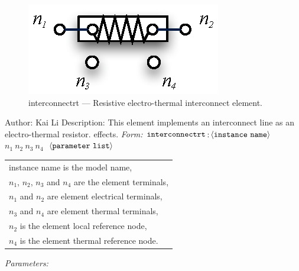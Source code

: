 \documentclass{article}
\begin{document}
\myThickLine
\normalsize
\newline
\begin{figure}[h]
\centerline{\includegraphics[scale=1.5]{interconnectrt.eps}} \caption{interconnectrt --- Resistive
electro-thermal interconnect element.}
\end{figure}
\newline
Author: Kai Li
\newline
\myThickLine
\newline
Description:\newline
This element implements an interconnect line as an electro-thermal resistor. effects.
\newline
\myThickLine
\newline
\textit{Form:}
$\tt interconnectrt$:$\langle \tt{instance\ name}\rangle$ $n_1\ n_2\ n_3\
n_4\ $ $\langle \tt{parameter\ list}\rangle$
\newline
\bigskip
\begin{tabular}{l}
instance name is the model name,\\
$n_1$, $n_2$, $n_3$ and $n_4$ are the element terminals, \\
$n_1$ and $n_2$ are element electrical terminals, \\
$n_3$ and $n_4$ are element thermal terminals, \\
$n_2$ is the element local reference node,\\
$n_4$ is the element thermal reference node. \\
\end{tabular}
\newline
\myThickLine
\textit{Parameters:}
\end{document}
